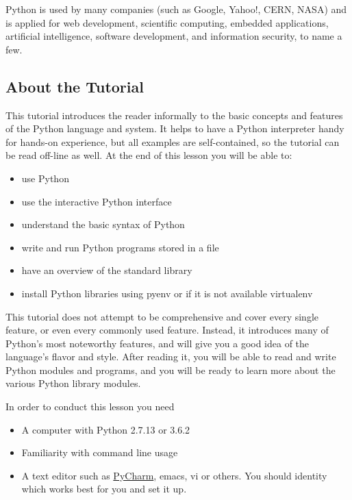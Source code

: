 Python is used by many companies (such as Google, Yahoo!, CERN, NASA)
and is applied for web development, scientific computing, embedded
applications, artificial intelligence, software development, and
information security, to name a few.

\subsection{About the Tutorial}\label{about-the-tutorial}

This tutorial introduces the reader informally to the basic concepts and
features of the Python language and system. It helps to have a Python
interpreter handy for hands-on experience, but all examples are
self-contained, so the tutorial can be read off-line as well. At the end
of this lesson you will be able to:

\begin{itemize}

\item
  use Python
\item
  use the interactive Python interface
\item
  understand the basic syntax of Python
\item
  write and run Python programs stored in a file
\item
  have an overview of the standard library
\item
  install Python libraries using pyenv or if it is not available
  virtualenv
\end{itemize}

This tutorial does not attempt to be comprehensive and cover every
single feature, or even every commonly used feature. Instead, it
introduces many of Python's most noteworthy features, and will give you
a good idea of the language's flavor and style. After reading it, you
will be able to read and write Python modules and programs, and you will
be ready to learn more about the various Python library modules.

In order to conduct this lesson you need

\begin{itemize}

\item
  A computer with Python 2.7.13 or 3.6.2
\item
  Familiarity with command line usage
\item
  A text editor such as
  \href{https://www.jetbrains.com/pycharm/}{PyCharm}, emacs, vi or
  others. You should identity which works best for you and set it up.
\end{itemize}

